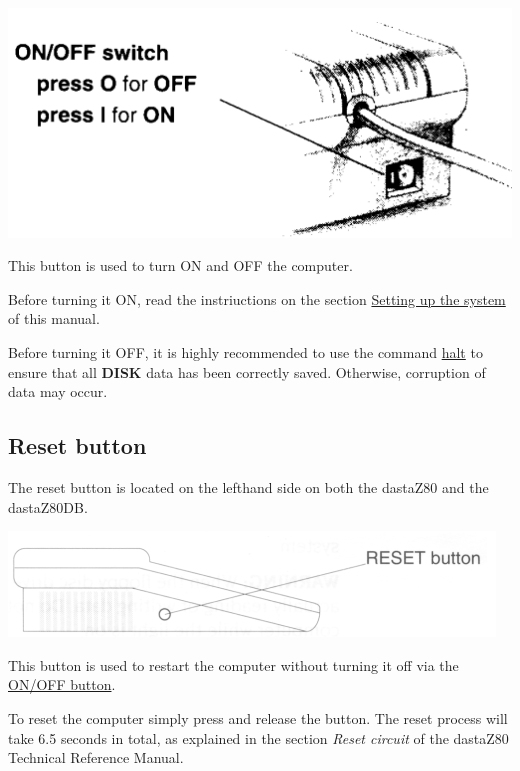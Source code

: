     \includegraphics[scale=0.5]{images/onoffbutton.png}

    This button is used to turn ON and OFF the computer.

    Before turning it ON, read the instriuctions on the section
    \hyperref[sec:setting_system]{Setting up the system} of this manual.

    Before turning it OFF, it is highly recommended to use the command 
    \hyperref[cmd:halt]{halt} to ensure that all \textbf{DISK} data has been
    correctly saved. Otherwise, corruption of data may occur.

    \subsection{Reset button}
    \label{subsec:resetbutton}

    The reset button is located on the lefthand side on both the dastaZ80 and
    the dastaZ80DB.

    \includegraphics[scale=0.7]{images/resetbutton.png}

    This button is used to restart the computer without turning it off via the
    \hyperref[subsec:onoffbutt]{ON/OFF button}.

    To reset the computer simply press and release the button. The reset process
    will take 6.5 seconds in total, as explained in the section
    \textit{Reset circuit} of the dastaZ80 Technical Reference
    Manual\cite{dastaz80techman}.

